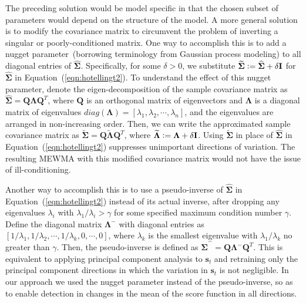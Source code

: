 \documentclass[twoside,11pt]{article}
\begin{document}
The preceding solution would be model specific in that the chosen subset of parameters would depend on the structure of the model. A more general solution is to modify the covariance matrix to circumvent the problem of inverting a singular or poorly-conditioned matrix. One way to accomplish this is to add a nugget parameter~(borrowing terminology from Gaussian process modeling) to all diagonal entries of $\widehat {\bm { \Sigma}}$. Specifically, for some $\delta>0$, we substitute $\widetilde {\bm { \Sigma}} \vcentcolon= \widehat {\bm { \Sigma}}+ \delta \mathbf {I}$ for $\widehat {\bm { \Sigma}}$ in Equation~(\ref{eqn:hotellingt2}). To understand the effect of this nugget parameter, denote the eigen-decomposition of the sample covariance matrix as $\widehat {\bm { \Sigma}} = \mathbf {Q}\bm { \Lambda} \mathbf {Q}^T$, where $\mathbf {Q}$ is an orthogonal matrix of eigenvectors and $\bm{\Lambda}$ is a diagonal matrix of eigenvalues $ diag(\bm{\Lambda}) = [ \lambda_1, \lambda_2,\cdots, \lambda_n]$, and the eigenvalues are arranged in non-increasing order. Then, we can write the approximated sample covariance matrix as $\widetilde {\bm { \Sigma}} = \mathbf {Q}\widetilde{\bm { \Lambda}} \mathbf {Q}^T$, where $\widetilde{\bm { \Lambda}} \vcentcolon= \bm { \Lambda} + \delta \mathbf {I}$. Using $\widetilde {\bm { \Sigma}}$ in place of $\widehat {\bm { \Sigma}}$ in Equation~(\ref{eqn:hotellingt2}) suppresses unimportant directions of variation. The resulting MEWMA with this modified covariance matrix would not have the issue of ill-conditioning. 

Another way to accomplish this is to use a pseudo-inverse of $\widehat {\bm { \Sigma}}$ in Equation~(\ref{eqn:hotellingt2}) instead of its actual inverse, after dropping any eigenvalues $\lambda_i$ with $\lambda_1/\lambda_i>\gamma$ for some specified maximum condition number $\gamma$. Define the diagonal matrix $\bm { \Lambda} ^{-}$ with diagonal entries as $[1/\lambda_1,1/\lambda_2, \cdots, 1/\lambda_k, 0, \cdots, 0]$, where $\lambda_k$ is the smallest eigenvalue with $\lambda_1/\lambda_k$ no greater than $\gamma$. Then, the pseudo-inverse is defined as $\widehat {\bm { \Sigma}} ^{-} = \mathbf {Q}\bm { \Lambda}^{-}\mathbf {Q}^T$. This is equivalent to applying principal component analysis to $\bm{s}_t$ and retraining only the principal component directions in which the variation in $\bm{s}_t$ is not negligible. In our approach we used the nugget parameter instead of the pseudo-inverse, so as to enable detection in changes in the mean of the score function in all directions. 
\end{document}
